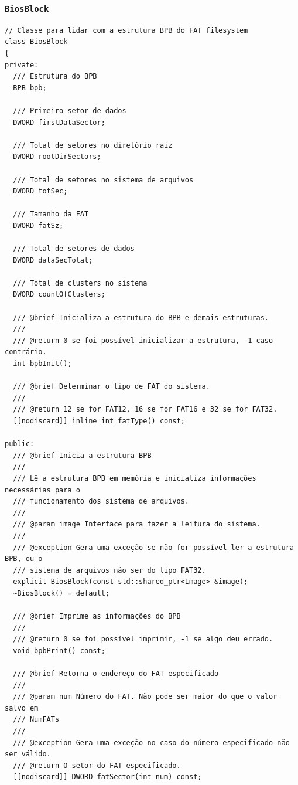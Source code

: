 \documentclass[
    12pt,				%
    oneside,   	        %
    a4paper,			%
    english,			%
    french,				%
    spanish,			%
    brazil,				%
    ]{pacotes/abntex2}
\begin{document}
\subsubsection{\texttt{BiosBlock}}
\label{subsubsec:bios_block}

\begin{lstlisting}[caption={Classe que abstrai a extração de informações da estrutura BPB}, label={lst:biosblock}]
// Classe para lidar com a estrutura BPB do FAT filesystem
class BiosBlock
{
private:
  /// Estrutura do BPB
  BPB bpb;

  /// Primeiro setor de dados
  DWORD firstDataSector;

  /// Total de setores no diretório raiz
  DWORD rootDirSectors;

  /// Total de setores no sistema de arquivos
  DWORD totSec;

  /// Tamanho da FAT
  DWORD fatSz;

  /// Total de setores de dados
  DWORD dataSecTotal;

  /// Total de clusters no sistema
  DWORD countOfClusters;

  /// @brief Inicializa a estrutura do BPB e demais estruturas.
  ///
  /// @return 0 se foi possível inicializar a estrutura, -1 caso contrário.
  int bpbInit();

  /// @brief Determinar o tipo de FAT do sistema.
  ///
  /// @return 12 se for FAT12, 16 se for FAT16 e 32 se for FAT32.
  [[nodiscard]] inline int fatType() const;

public:
  /// @brief Inicia a estrutura BPB
  ///
  /// Lê a estrutura BPB em memória e inicializa informações necessárias para o
  /// funcionamento dos sistema de arquivos.
  ///
  /// @param image Interface para fazer a leitura do sistema.
  ///
  /// @exception Gera uma exceção se não for possível ler a estrutura BPB, ou o
  /// sistema de arquivos não ser do tipo FAT32.
  explicit BiosBlock(const std::shared_ptr<Image> &image);
  ~BiosBlock() = default;

  /// @brief Imprime as informações do BPB
  ///
  /// @return 0 se foi possível imprimir, -1 se algo deu errado.
  void bpbPrint() const;

  /// @brief Retorna o endereço do FAT especificado
  ///
  /// @param num Número do FAT. Não pode ser maior do que o valor salvo em
  /// NumFATs
  ///
  /// @exception Gera uma exceção no caso do número especificado não ser válido.
  /// @return O setor do FAT especificado.
  [[nodiscard]] DWORD fatSector(int num) const;


\end{lstlisting}
\end{document}
